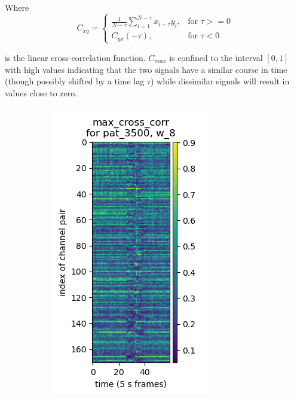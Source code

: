 Where
\begin{equation}
    C_{xy} = \begin{cases}
        \frac{1}{N-\tau}\sum_{i=1}^{N-\tau}x_{i+\tau}y_i, & \text{for } \tau >= 0\\
        C_{yx}(-\tau), & \text{for } \tau < 0
        \end{cases}
\end{equation}

is the linear cross-correlation function. $C_{max}$ is confined to the interval $[0,1]$ with high values indicating that the two signals have a similar course in time (though possibly shifted by a time lag $\tau$) while dissimilar signals will result in values close to zero.

\begin{figure}[htb]
    \centering
    \begin{subfigure}[t]{0.4\textwidth}
        \includegraphics[width=\textwidth]{c2Deterministic/Figs/PSP/max_cross_corr.png}

\end{subfigure}
\end{figure}
